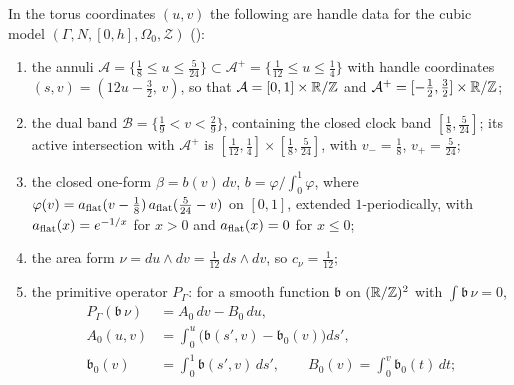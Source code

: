 \begin{proposition}\label{prop:cub-handle}
In the torus coordinates $(u,v)$ the following are handle data for the cubic model
$(\Gamma,N,[0,h],\Omega_0,\mathcal Z)$ ():
\begin{enumerate}[label=(\alph*)]
\item the annuli $\mathcal A=\{\frac18\le u\le\frac5{24}\}\subset\mathcal A^+=\{\frac1{12}\le u\le\frac14\}$ with handle
coordinates $(s,v)=(12u-\frac32,\,v)$, so that $\mathcal A=[0,1]\times\mathbb{R}/\mathbb{Z}$ and $\mathcal A^+=[-\frac12,\frac32]\times\mathbb{R}/\mathbb{Z}$;
\item the dual band $\mathcal B=\{\frac19<v<\frac29\}$, containing the closed clock band $[\frac18,\frac5{24}]$; its active intersection with $\mathcal A^+$ is $[\frac1{12},\frac14]\times[\frac18,\frac5{24}]$, with $v_-=\frac18$, $v_+=\frac5{24}$;
\item the closed one-form $\beta=b(v)\,dv$, $b=\varphi/\int_0^1\varphi$, where
$\varphi(v)=a_{\rm flat}(v-\frac18)\,a_{\rm flat}(\frac5{24}-v)$ on $[0,1]$, extended $1$-periodically, with
$a_{\rm flat}(x)=e^{-1/x}$ for $x>0$ and $a_{\rm flat}(x)=0$ for $x\le0$;
\item the area form $\nu=du\wedge dv=\frac1{12}\,ds\wedge dv$, so $c_\nu=\frac1{12}$;
\item the primitive operator $P_\Gamma$: for a smooth function $\mathfrak b$ on $(\mathbb{R}/\mathbb{Z})^2$ with $\int\mathfrak b\,\nu=0$,
\[
\begin{aligned}
 P_\Gamma(\mathfrak b\,\nu)&=A_0\,dv-B_0\,du,\\
 A_0(u,v)&=\int_0^u\big(\mathfrak b(s',v)-\mathfrak b_0(v)\big)ds',\\
 \mathfrak b_0(v)&=\int_0^1\mathfrak b(s',v)\,ds',\qquad B_0(v)=\int_0^v\mathfrak b_0(t)\,dt;
\end{aligned}
\]
\end{enumerate}
\end{proposition}

